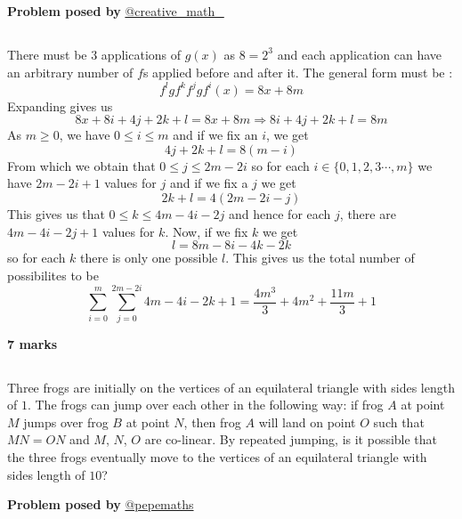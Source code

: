 \documentclass[12pt]{article}
\begin{document}
\begin{flushright}
\textbf{Problem posed by}
\textcolor{RoyalBlue2}{\href{https://www.instagram.com/creative_math_/}{@creative\_math\_}}
\end{flushright}



\subsection*{}
There must be 3 applications of $g(x)$ as $8 = 2^3$ and each application can have an arbitrary number of $f$s applied before and after it. The general form must be : 
$$ f^lgf^kf^jgf^i (x) = 8x + 8m $$
Expanding gives us 
$$ 8x+8i+4j+2k+l = 8x+8m \Rightarrow 8i+4j+2k+l = 8m $$
As $m \geq 0 $, we have $ 0 \leq i \leq m $ and if we fix an $i$, we get 
$$ 4j+2k+l = 8(m-i) $$
From which we obtain that $0\leq j \leq 2m-2i$ so for each $i \in \{ 0,1,2,3\cdots, m \}$ we have $2m-2i+1$ values for $j$ and if we fix a $j$ we get 
$$ 2k+l = 4(2m-2i-j) $$
This gives us that $ 0 \leq k \leq 4m-4i-2j $ and hence for each $j$, there are $4m-4i-2j+1$ values for $k$. Now, if we fix $k$ we get 
$$ l = 8m-8i-4k-2k $$
so for each $k$ there is only one possible $l$. This gives us the total number of possibilites to be 
$$ \sum_{i=0}^{m}\sum_{j=0}^{2m-2i} 4m-4i -2k + 1 = \frac{4m^3}{3} + 4m^2 + \frac{11m}{3} + 1$$
\begin{flushright}
\textbf{7 marks}
\end{flushright}



\subsection*{}
Three frogs are initially on the vertices of an equilateral triangle with sides length of $1$. The frogs can jump over each other in the following way: if frog $A$ at point $M$ jumps over frog $B$ at point $N$, then frog $A$ will land on point $O$ such that $MN=ON$ and $M$, $N$, $O$ are co-linear.  By repeated jumping, is it possible that the three frogs eventually move to the vertices of an equilateral triangle with sides length of $10$?


\begin{flushright}
\textbf{Problem posed by}
\textcolor{RoyalBlue2}{\href{https://www.instagram.com/pepemaths/}{@pepemaths}}
\end{flushright}
\end{document}
